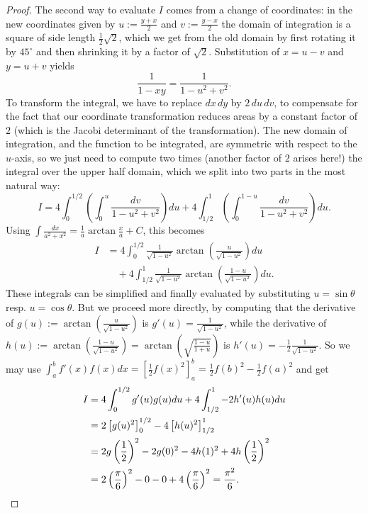 \begin{proof}
  The second way to evaluate $I$ comes from a change of coordinates:
  in the new coordinates given by $u := \frac{y+x}{2}$ and $v := \frac{y-x}{2}$ the domain of integration is a square of side length $\frac{1}{2}\sqrt{2}$,
  which we get from the old domain by first rotating it by $45^\circ$ and then shrinking it by a factor of $\sqrt{2}$.
  Substitution of $x = u-v$ and $y = u+v$ yields
  \[
  \frac{1}{1-xy} = \frac{1}{1-u^2+v^2}.
  \]
  To transform the integral, we have to replace $dx \, dy$ by $2 \, du \, dv$, to compensate for the fact that our coordinate transformation
  reduces areas by a constant factor of $2$ (which is the Jacobi determinant of the transformation).
  The new domain of integration, and the function to be integrated, are symmetric with respect to the $u$-axis,
  so we just need to compute two times (another factor of $2$ arises here!) the integral over the upper half domain,
  which we split into two parts in the most natural way:
  \[
  I = 4 \int_0^{1/2} \left(\int_0^u \frac{dv}{1-u^2+v^2}\right) du + 4 \int_{1/2}^1 \left(\int_0^{1-u} \frac{dv}{1-u^2+v^2}\right) du.
  \]
  Using $\int \frac{dx}{a^2+x^2} = \frac{1}{a} \arctan \frac{x}{a} + C$, this becomes
  \begin{align*}
  I &= 4 \int_0^{1/2} \frac{1}{\sqrt{1-u^2}} \arctan \left(\frac{u}{\sqrt{1-u^2}}\right) du \\
  &\quad + 4 \int_{1/2}^1 \frac{1}{\sqrt{1-u^2}} \arctan \left(\frac{1-u}{\sqrt{1-u^2}}\right) du.
  \end{align*}
  These integrals can be simplified and finally evaluated by substituting $u = \sin \theta$ resp. $u = \cos \theta$.
  But we proceed more directly, by computing that the derivative of $g(u) := \arctan \left(\frac{u}{\sqrt{1-u^2}}\right)$ is $g'(u) = \frac{1}{\sqrt{1-u^2}}$,
  while the derivative of $h(u) := \arctan \left(\frac{1-u}{\sqrt{1-u^2}}\right) = \arctan \left(\sqrt{\frac{1-u}{1+u}}\right)$ is $h'(u) = -\frac{1}{2} \frac{1}{\sqrt{1-u^2}}$.
  So we may use $\int_a^b f'(x) f(x) dx = \left[ \frac{1}{2} f(x)^2 \right]_a^b = \frac{1}{2} f(b)^2 - \frac{1}{2} f(a)^2$ and get
  \begin{align*}
  I &= 4 \int_0^{1/2} g'(u) g(u) du + 4 \int_{1/2}^1 -2 h'(u) h(u) du \\
  &= 2 \left[ g(u)^2 \right]_0^{1/2} - 4 \left[ h(u)^2 \right]_{1/2}^1 \\
  &= 2 g\left(\frac{1}{2}\right)^2 - 2 g(0)^2 - 4 h(1)^2 + 4 h\left(\frac{1}{2}\right)^2 \\
  &= 2 \left(\frac{\pi}{6}\right)^2 - 0 - 0 + 4 \left(\frac{\pi}{6}\right)^2 = \frac{\pi^2}{6}. \qedhere
  \end{align*}
\end{proof}


